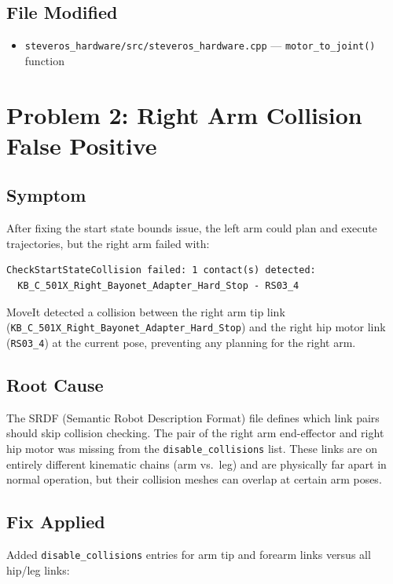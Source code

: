 \documentclass[11pt,a4paper]{article}
\begin{document}
\subsection{File Modified}
\begin{itemize}
  \item \texttt{steveros\_hardware/src/steveros\_hardware.cpp} --- \texttt{motor\_to\_joint()} function
\end{itemize}

\section{Problem 2: Right Arm Collision False Positive}

\subsection{Symptom}
After fixing the start state bounds issue, the left arm could plan and execute
trajectories, but the right arm failed with:

\begin{lstlisting}[language={}]
CheckStartStateCollision failed: 1 contact(s) detected:
  KB_C_501X_Right_Bayonet_Adapter_Hard_Stop - RS03_4
\end{lstlisting}

MoveIt detected a collision between the right arm tip link
(\texttt{KB\_C\_501X\_Right\_Bayonet\_Adapter\_Hard\_Stop}) and the right hip motor link
(\texttt{RS03\_4}) at the current pose, preventing any planning for the right arm.

\subsection{Root Cause}
The SRDF (Semantic Robot Description Format) file defines which link pairs should
skip collision checking. The pair of the right arm end-effector and right hip motor
was missing from the \texttt{disable\_collisions} list. These links are on entirely
different kinematic chains (arm vs.\ leg) and are physically far apart in normal
operation, but their collision meshes can overlap at certain arm poses.

\subsection{Fix Applied}
Added \texttt{disable\_collisions} entries for arm tip and forearm links versus all
hip/leg links:
\end{document}
